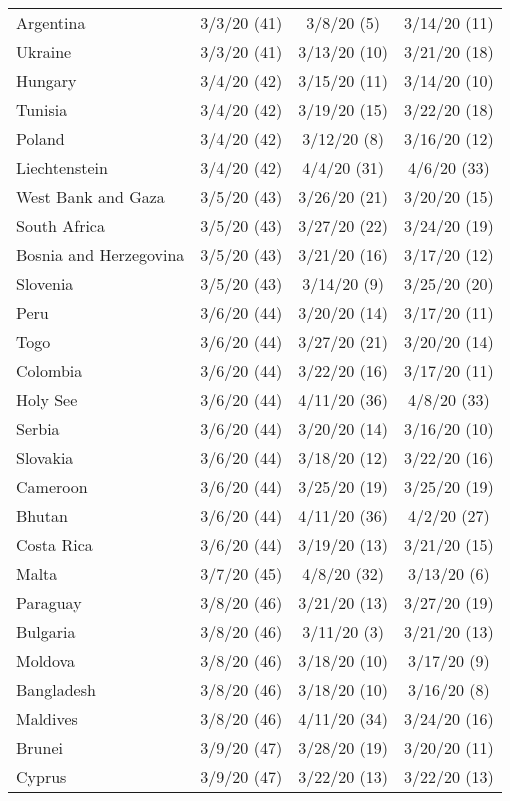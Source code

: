 \begin{table}[h]
\begin{longtable}{p{} c c c}
Argentina & 3/3/20 (41)  & 3/8/20 (5)  & 3/14/20 (11) \\
Ukraine & 3/3/20 (41)  & 3/13/20 (10)  & 3/21/20 (18) \\
\hline 
Hungary & 3/4/20 (42)  & 3/15/20 (11)  & 3/14/20 (10) \\
Tunisia & 3/4/20 (42)  & 3/19/20 (15)  & 3/22/20 (18) \\
Poland & 3/4/20 (42)  & 3/12/20 (8)  & 3/16/20 (12) \\
Liechtenstein & 3/4/20 (42)  & 4/4/20 (31)  & 4/6/20 (33) \\
\hline 
West Bank and Gaza & 3/5/20 (43)  & 3/26/20 (21)  & 3/20/20 (15) \\
South Africa & 3/5/20 (43)  & 3/27/20 (22)  & 3/24/20 (19) \\
Bosnia and Herzegovina & 3/5/20 (43)  & 3/21/20 (16)  & 3/17/20 (12) \\
Slovenia & 3/5/20 (43)  & 3/14/20 (9)  & 3/25/20 (20) \\
\hline 
Peru & 3/6/20 (44)  & 3/20/20 (14)  & 3/17/20 (11) \\
Togo & 3/6/20 (44)  & 3/27/20 (21)  & 3/20/20 (14) \\
Colombia & 3/6/20 (44)  & 3/22/20 (16)  & 3/17/20 (11) \\
Holy See & 3/6/20 (44)  & 4/11/20 (36)  & 4/8/20 (33) \\
Serbia & 3/6/20 (44)  & 3/20/20 (14)  & 3/16/20 (10) \\
Slovakia & 3/6/20 (44)  & 3/18/20 (12)  & 3/22/20 (16) \\
Cameroon & 3/6/20 (44)  & 3/25/20 (19)  & 3/25/20 (19) \\
Bhutan & 3/6/20 (44)  & 4/11/20 (36)  & 4/2/20 (27) \\
Costa Rica & 3/6/20 (44)  & 3/19/20 (13)  & 3/21/20 (15) \\
\hline 
Malta & 3/7/20 (45)  & 4/8/20 (32)  & 3/13/20 (6) \\
\hline 
Paraguay & 3/8/20 (46)  & 3/21/20 (13)  & 3/27/20 (19) \\
Bulgaria & 3/8/20 (46)  & 3/11/20 (3)  & 3/21/20 (13) \\
Moldova & 3/8/20 (46)  & 3/18/20 (10)  & 3/17/20 (9) \\
Bangladesh & 3/8/20 (46)  & 3/18/20 (10)  & 3/16/20 (8) \\
Maldives & 3/8/20 (46)  & 4/11/20 (34)  & 3/24/20 (16) \\
\hline 
Brunei & 3/9/20 (47)  & 3/28/20 (19)  & 3/20/20 (11) \\
Cyprus & 3/9/20 (47)  & 3/22/20 (13)  & 3/22/20 (13) \\

\end{longtable}
\end{table}
